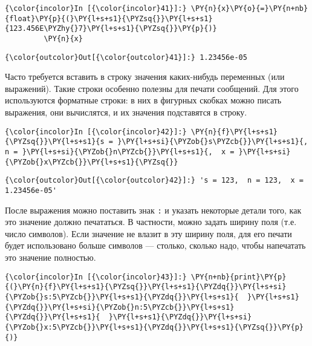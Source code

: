     \begin{Verbatim}[commandchars=\\\{\}]
{\color{incolor}In [{\color{incolor}41}]:} \PY{n}{x}\PY{o}{=}\PY{n+nb}{float}\PY{p}{(}\PY{l+s+s1}{\PYZsq{}}\PY{l+s+s1}{123.456E\PYZhy{}7}\PY{l+s+s1}{\PYZsq{}}\PY{p}{)}
         \PY{n}{x}
\end{Verbatim}

            \begin{Verbatim}[commandchars=\\\{\}]
{\color{outcolor}Out[{\color{outcolor}41}]:} 1.23456e-05
\end{Verbatim}
        
    Часто требуется вставить в строку значения каких-нибудь переменных (или
выражений). Такие строки особенно полезны для печати сообщений. Для
этого используются форматные строки: в них в фигурных скобках можно писать
выражения, они вычислятся, и их значения подставятся в строку.

    \begin{Verbatim}[commandchars=\\\{\}]
{\color{incolor}In [{\color{incolor}42}]:} \PY{n}{f}\PY{l+s+s1}{\PYZsq{}}\PY{l+s+s1}{s = }\PY{l+s+si}{\PYZob{}s\PYZcb{}}\PY{l+s+s1}{,  n = }\PY{l+s+si}{\PYZob{}n\PYZcb{}}\PY{l+s+s1}{,  x = }\PY{l+s+si}{\PYZob{}x\PYZcb{}}\PY{l+s+s1}{\PYZsq{}}
\end{Verbatim}

            \begin{Verbatim}[commandchars=\\\{\}]
{\color{outcolor}Out[{\color{outcolor}42}]:} 's = 123,  n = 123,  x = 1.23456e-05'
\end{Verbatim}
        
    После выражения можно поставить знак \texttt{:} и указать некоторые
детали того, как это значение должно печататься. В частности, можно
задать ширину поля (т.е. число символов). Если значение не влазит в эту
ширину поля, для его печати будет использовано больше символов ---
столько, сколько надо, чтобы напечатать это значение полностью.

    \begin{Verbatim}[commandchars=\\\{\}]
{\color{incolor}In [{\color{incolor}43}]:} \PY{n+nb}{print}\PY{p}{(}\PY{n}{f}\PY{l+s+s1}{\PYZsq{}}\PY{l+s+s1}{\PYZdq{}}\PY{l+s+si}{\PYZob{}s:5\PYZcb{}}\PY{l+s+s1}{\PYZdq{}}\PY{l+s+s1}{  }\PY{l+s+s1}{\PYZdq{}}\PY{l+s+si}{\PYZob{}n:5\PYZcb{}}\PY{l+s+s1}{\PYZdq{}}\PY{l+s+s1}{  }\PY{l+s+s1}{\PYZdq{}}\PY{l+s+si}{\PYZob{}x:5\PYZcb{}}\PY{l+s+s1}{\PYZdq{}}\PY{l+s+s1}{\PYZsq{}}\PY{p}{)}
\end{Verbatim}

